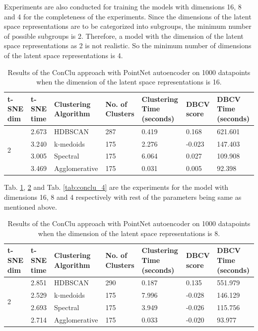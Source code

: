 Experiments are also conducted for training the models with dimensions 16, 8 and 4 for the completeness of the experiments. Since the dimensions of the latent space representations are to be categorized into subgroups, the minimum number of possible subgroups is 2. Therefore, a model with the dimension of the latent space representations as 2 is not realistic. So the minimum number of dimensions of the latent space representations is 4. 

\begin{table}[H]
  \setlength\extrarowheight{10pt}
  \caption{Results of the ConClu approach with PointNet autoencoder on 1000 datapoints when the dimension of the latent space representations is 16. }
  \centering
  \begin{tabular}{|p{30pt}|p{50pt}|p{60pt}|p{50pt}|p{50pt}|p{50pt}|p{40pt}|}
    \toprule
    \ac{t-SNE} dim	& \ac{t-SNE} time & Clustering Algorithm & No. of Clusters & Clustering Time (seconds) & \ac{DBCV} score & \ac{DBCV} Time (seconds)\\
    \midrule
    \multirow{4}{30pt}{2}	& 2.673 & \ac{HDBSCAN}	& 287	& 0.419 & 0.168	& 621.601 \\ \cline{2-7} 
    & 3.240 & k-medoids	& 175	& 2.276	& -0.023	& 147.403 \\ \cline{2-7} 
    & 3.005 & Spectral	& 175	& 6.064 & 0.027	& 109.908 \\ \cline{2-7}
    & 3.469 & Agglomerative	& 175	& 0.031 & 0.005	& 92.398 \\ 
    \bottomrule
  \end{tabular}
  \label{tab:conclu_16}
\end{table} 

Tab. \ref{tab:conclu_16}, \ref{tab:conclu_8} and Tab. \ref{tab:conclu_4} are the experiments for the model with dimensions 16, 8 and 4 respectively with rest of the parameters being same as mentioned above.

\begin{table}[H]
  \setlength\extrarowheight{10pt}
  \caption{Results of the ConClu approach with PointNet autoencoder on 1000 datapoints when the dimension of the latent space representations is 8. }
  \centering
  \begin{tabular}{|p{30pt}|p{50pt}|p{60pt}|p{50pt}|p{50pt}|p{50pt}|p{40pt}|}
    \toprule
    \ac{t-SNE} dim	& \ac{t-SNE} time & Clustering Algorithm & No. of Clusters & Clustering Time (seconds) & \ac{DBCV} score & \ac{DBCV} Time (seconds)\\
    \midrule
    \multirow{4}{30pt}{2}	& 2.851 & \ac{HDBSCAN}	& 290	& 0.187 & 0.135	& 551.979 \\ \cline{2-7} 
    & 2.529 & k-medoids	& 175	& 7.996 & -0.028	& 146.129 \\ \cline{2-7} 
    & 2.693 & Spectral	& 175	& 3.949 & -0.026	& 115.756 \\ \cline{2-7}
    & 2.714 & Agglomerative	& 175	& 0.033 & -0.020	& 93.977 \\ 
    \bottomrule
  \end{tabular}
  \label{tab:conclu_8}
\end{table}

